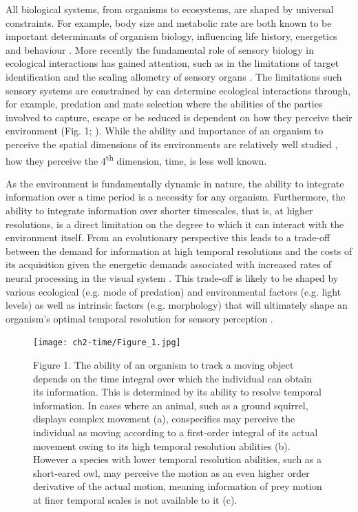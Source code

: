 All biological systems, from organisms to ecosystems, are shaped by universal constraints. For example, body size and metabolic rate are both known to be important determinants of organism biology, influencing life history, energetics and behaviour \citep{brown2004, woodward2005, sibly2012metabolic}. More recently the fundamental role of sensory biology in ecological interactions has gained attention, such as in the limitations of target identification \citep{tosh2010modelling} and the scaling allometry of sensory organs \citep{howland2004allometry,cronin2005role,garamszegi2002coevolving,kiltie2000scaling}. The limitations such sensory systems are constrained by can determine ecological interactions through, for example, predation and mate selection where the abilities of the parties involved to capture, escape or be seduced is dependent on how they perceive their environment (Fig. 1; \citealt{cronin2005role,clark2012field,hornstein2000sexual,stevens2007predator}). While the ability and importance of an organism to perceive the spatial dimensions of its environments are relatively well studied \citep{cronin2005role,clark2012field}, how they perceive the 4\textsuperscript{th} dimension, time, is less well known.

As the environment is fundamentally dynamic in nature, the ability to integrate information over a time period is a necessity for any organism. Furthermore, the ability to integrate information over shorter timescales, that is, at higher resolutions, is a direct limitation on the degree to which it can interact with the environment itself. From an evolutionary perspective this leads to a trade-off between the demand for information at high temporal resolutions and the costs of its acquisition given the energetic demands associated with increased rates of neural processing in the visual system \citep{laughlin2001energy}. This trade-off is likely to be shaped by various ecological (e.g. mode of predation) and environmental factors (e.g. light levels) as well as intrinsic factors (e.g. morphology) that will ultimately shape an organism's optimal temporal resolution for sensory perception \citep{autrum1958electrophysiological}.


\begin{figure}[p]
  \centering
  \texttt{[image: ch2-time/Figure\_1.jpg]}
  \caption[ ]{Figure 1. The ability of an organism to track a moving object depends on the time integral over which the individual can obtain its information. This is determined by its ability to resolve temporal information. In cases where an animal, such as a ground squirrel, displays complex movement (a), conspecifics may perceive the individual as moving according to a first-order integral of its actual movement owing to its high temporal resolution abilities (b). However a species with lower temporal resolution abilities, such as a short-eared owl, may perceive the motion as an even higher order derivative of the actual motion, meaning information of prey motion at finer temporal scales is not available to it (c).}
  \label{fig:Figure 1.}
\end{figure}


